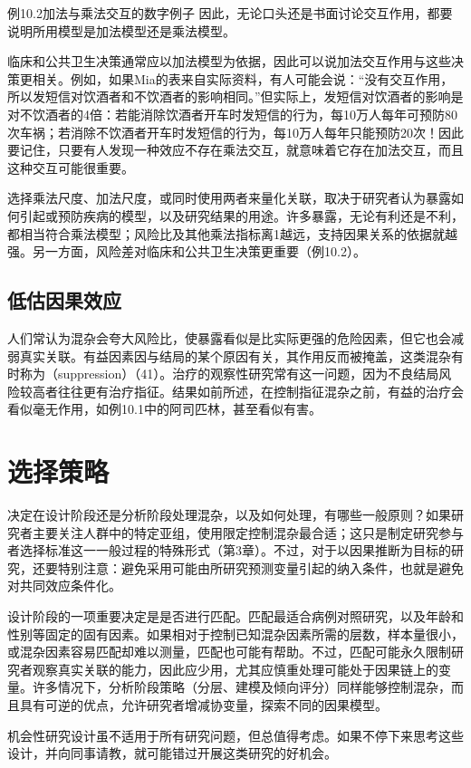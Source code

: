 \begin{bookbox}{例10.2\quad 加法与乘法交互的数字例子}
因此，无论口头还是书面讨论交互作用，都要说明所用模型是加法模型还是乘法模型。

临床和公共卫生决策通常应以加法模型为依据，因此可以说加法交互作用与这些决策更相关。例如，如果Mia的表来自实际资料，有人可能会说：“没有交互作用，所以发短信对饮酒者和不饮酒者的影响相同。”但实际上，发短信对饮酒者的影响是对不饮酒者的4倍：若能消除饮酒者开车时发短信的行为，每10万人每年可预防80次车祸；若消除不饮酒者开车时发短信的行为，每10万人每年只能预防20次！因此要记住，只要有人发现一种效应不存在乘法交互，就意味着它存在加法交互，而且这种交互可能很重要。
\end{bookbox}

选择乘法尺度、加法尺度，或同时使用两者来量化关联，取决于研究者认为暴露如何引起或预防疾病的模型，以及研究结果的用途。许多暴露，无论有利还是不利，都相当符合乘法模型；风险比及其他乘法指标离1越远，支持因果关系的依据就越强。另一方面，风险差对临床和公共卫生决策更重要（例10.2）。

\subsection{低估因果效应}
人们常认为混杂会夸大风险比，使暴露看似是比实际更强的危险因素，但它也会减弱真实关联。有益因素因与结局的某个原因有关，其作用反而被掩盖，这类混杂有时称为（suppression）（41）。治疗的观察性研究常有这一问题，因为不良结局风险较高者往往更有治疗指征。结果如前所述，在控制指征混杂之前，有益的治疗会看似毫无作用，如例10.1中的阿司匹林，甚至看似有害。

\section{选择策略}
决定在设计阶段还是分析阶段处理混杂，以及如何处理，有哪些一般原则？如果研究者主要关注人群中的特定亚组，使用限定控制混杂最合适；这只是制定研究参与者选择标准这一一般过程的特殊形式（第3章）。不过，对于以因果推断为目标的研究，还要特别注意：避免采用可能由所研究预测变量引起的纳入条件，也就是避免对共同效应条件化。

设计阶段的一项重要决定是是否进行匹配。匹配最适合病例对照研究，以及年龄和性别等固定的固有因素。如果相对于控制已知混杂因素所需的层数，样本量很小，或混杂因素容易匹配却难以测量，匹配也可能有帮助。不过，匹配可能永久限制研究者观察真实关联的能力，因此应少用，尤其应慎重处理可能处于因果链上的变量。许多情况下，分析阶段策略（分层、建模及倾向评分）同样能够控制混杂，而且具有可逆的优点，允许研究者增减协变量，探索不同的因果模型。

机会性研究设计虽不适用于所有研究问题，但总值得考虑。如果不停下来思考这些设计，并向同事请教，就可能错过开展这类研究的好机会。

